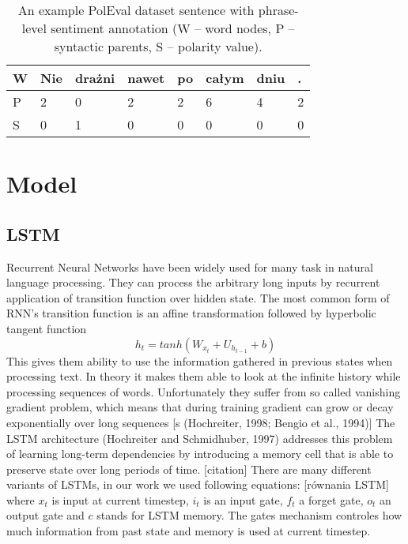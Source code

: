 \documentclass[10pt, a4paper]{article}
\begin{document}
\begin{table}[h]
 \begin{center}
\begin{tabular}{|l l l l l l l l|}

      \hline
      W & Nie & drażni & nawet & po & całym & dniu & . \\
      \hline
      P & 2 & 0 & 2 & 2 & 6 & 4 & 2 \\
      \hline
      S & 0 & 1 & 0 & 0 & 0 & 0 & 0 \\
 
      \hline
\end{tabular}
\caption{An example PolEval dataset sentence with phrase-level sentiment annotation (W -- word nodes, P -- syntactic parents, S -- polarity value).}
\label{tab:nie_drazni_1}
 \end{center}
\end{table}






\section{Model} 


\subsection{LSTM}

Recurrent Neural Networks have been widely used for many task in natural language processing. They can process the arbitrary long inputs by recurrent application of transition function over hidden state. 
	The most common form of RNN's transition function is an affine transformation followed by hyperbolic tangent function
	\begin{equation} h_t = tanh(W_{x_t}+U_{h_{t-1}}+b)
\end{equation}
	  	This gives them ability to use the information gathered in previous states when processing text. In theory it makes them able to look at the infinite history while processing sequences of words. 	Unfortunately they suffer from so called vanishing gradient problem, which means that during training gradient can grow or decay exponentially over long sequences [s (Hochreiter,
1998; Bengio et al., 1994)]
	The LSTM architecture (Hochreiter and Schmidhuber, 1997) addresses this problem of learning long-term dependencies by introducing a memory cell that is able to preserve state over long periods of time. [citation]
		There are many different variants of LSTMs, in our work we used following equations:
		[równania LSTM]		
		where $x_t$ is input at current timestep, $i_t$ is an input gate, $f_t$ a forget gate, $o_t$ an output gate and $c$ stands for LSTM memory.
		The gates mechanism controles how much information from past state and memory is used at current timestep. 
\end{document}
